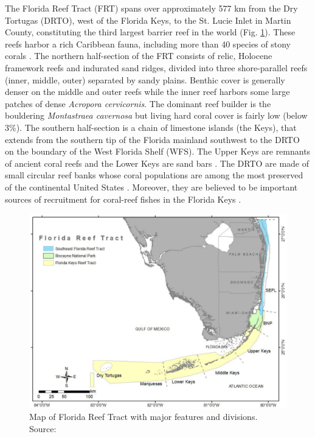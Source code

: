 The Florida Reef Tract (FRT) spans over approximately 577 km from the Dry Tortugas (DRTO), west of the Florida Keys, to the St. Lucie Inlet in Martin County, constituting the third largest barrier reef in the world \citep{finkl2008shelf} (Fig. \ref{intro:frt}). These reefs harbor a rich Caribbean fauna, including more than 40 species of stony corals \citep{banks2008reef,jackson2014status}. The northern half-section of the FRT consists of relic, Holocene framework reefs and indurated sand ridges, divided into three shore-parallel reefs (inner, middle, outer) separated by sandy plains. Benthic cover is generally denser on the middle and outer reefs while the inner reef harbors some large patches of dense \textit{Acropora cervicornis}. The dominant reef builder is the bouldering \textit{Montastraea cavernosa} but living hard coral cover is fairly low (below 3\%)\citep{banks2008reef,walton2018impacts}. The southern half-section is a chain of limestone islands (the Keys), that extends from the southern tip of the Florida mainland southwest to the DRTO on the boundary of the West Florida Shelf (WFS). The Upper Keys are remnants of ancient coral reefs and the Lower Keys are sand bars \citep{hoffmeister1968geology}. The DRTO are made of small circular reef banks whose coral populations are among the most preserved of the continental United States \citep{hine2008coral, kourafalou2018physical}. Moreover, they are believed to be important sources of recruitment for coral-reef fishes in the Florida Keys \citep{domeier2004potential}. 

\begin{figure}
    \centering
    \includegraphics[width=\textwidth]{chapters/intro/figures/frt.png}
    \caption{Map of Florida Reef Tract with major features and divisions. Source: \cite{kupfner2019untapped}}
    \label{intro:frt}
\end{figure}

